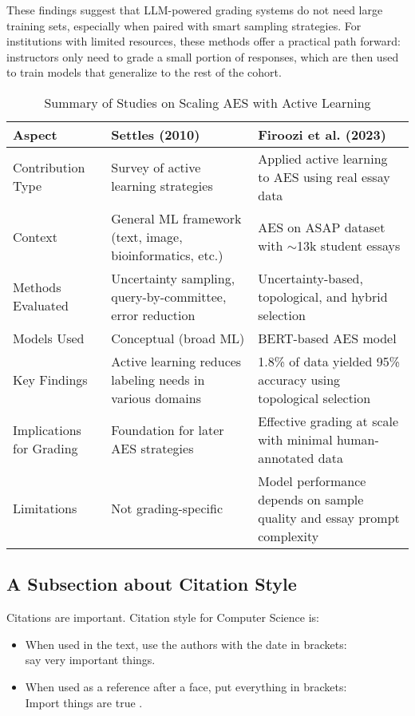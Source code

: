 \documentclass[a4paper,twoside,12pt]{report}
\begin{document}
These findings suggest that LLM-powered grading systems do not need large training sets, especially when paired with smart sampling strategies. For institutions with limited resources, these methods offer a practical path forward: instructors only need to grade a small portion of responses, which are then used to train models that generalize to the rest of the cohort.
\begin{table}[h!]
  \centering
  \begin{tabular}{|p{3.5cm}|p{6.5cm}|p{6.5cm}|}
  \hline
  \textbf{Aspect} & \textbf{Settles (2010)} & \textbf{Firoozi et al. (2023)} \\
  \hline
  Contribution Type & Survey of active learning strategies & Applied active learning to AES using real essay data \\
  \hline
  Context & General ML framework (text, image, bioinformatics, etc.) & AES on ASAP dataset with $\sim$13k student essays \\
  \hline
  Methods Evaluated & Uncertainty sampling, query-by-committee, error reduction & Uncertainty-based, topological, and hybrid selection \\
  \hline
  Models Used & Conceptual (broad ML) & BERT-based AES model \\
  \hline
  Key Findings & Active learning reduces labeling needs in various domains & 1.8\% of data yielded 95\% accuracy using topological selection \\
  \hline
  Implications for Grading & Foundation for later AES strategies & Effective grading at scale with minimal human-annotated data \\
  \hline
  Limitations & Not grading-specific & Model performance depends on sample quality and essay prompt complexity \\
  \hline
  \end{tabular}
  \caption{Summary of Studies on Scaling AES with Active Learning}
  \label{tab:active_learning_aes}
  \end{table}
  
















\subsection{A Subsection about Citation Style}
Citations are important. Citation style for Computer Science is:
\begin{itemize}
\item When used in the text, use the authors with the date in brackets:\\ \citet{klein17} say very important things.
\item When used as a reference after a face, put everything in brackets:\\ Import things are true \citep{klein17}.
\end{itemize}
\end{document}
